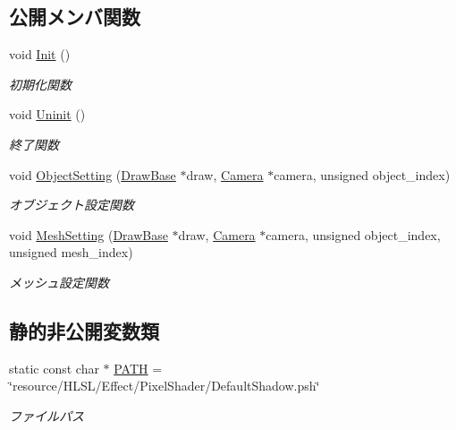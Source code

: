 \subsection*{公開メンバ関数}
\begin{DoxyCompactItemize}
\item 
void \mbox{\hyperlink{class_pixel_shader_default_shadow_a22be67e887bcad8d9b6725cbae7e3abc}{Init}} ()
\begin{DoxyCompactList}\small\item\em 初期化関数 \end{DoxyCompactList}\item 
void \mbox{\hyperlink{class_pixel_shader_default_shadow_abd9b03c980fed91c4fc14bbab244adbd}{Uninit}} ()
\begin{DoxyCompactList}\small\item\em 終了関数 \end{DoxyCompactList}\item 
void \mbox{\hyperlink{class_pixel_shader_default_shadow_ac7e4f76ddef588b97dd898c31023be37}{Object\+Setting}} (\mbox{\hyperlink{class_draw_base}{Draw\+Base}} $\ast$draw, \mbox{\hyperlink{class_camera}{Camera}} $\ast$camera, unsigned object\+\_\+index)
\begin{DoxyCompactList}\small\item\em オブジェクト設定関数 \end{DoxyCompactList}\item 
void \mbox{\hyperlink{class_pixel_shader_default_shadow_adec247949dea3a73545f602641a99103}{Mesh\+Setting}} (\mbox{\hyperlink{class_draw_base}{Draw\+Base}} $\ast$draw, \mbox{\hyperlink{class_camera}{Camera}} $\ast$camera, unsigned object\+\_\+index, unsigned mesh\+\_\+index)
\begin{DoxyCompactList}\small\item\em メッシュ設定関数 \end{DoxyCompactList}\end{DoxyCompactItemize}
\subsection*{静的非公開変数類}
\begin{DoxyCompactItemize}
\item 
static const char $\ast$ \mbox{\hyperlink{class_pixel_shader_default_shadow_a689c29d30938bcd03246929bc99b3907}{P\+A\+TH}} = \char`\"{}resource/H\+L\+SL/Effect/Pixel\+Shader/Default\+Shadow.\+psh\char`\"{}
\begin{DoxyCompactList}\small\item\em ファイルパス \end{DoxyCompactList}\end{DoxyCompactItemize}
